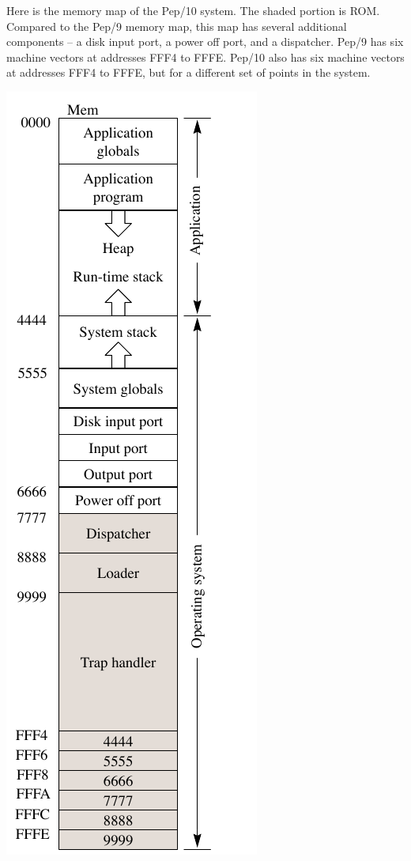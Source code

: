 \documentclass[10pt,fleqn]{book}
\begin{document}
\newpage

\noindent Here is the memory map of the Pep/10 system.
The shaded portion is ROM.
Compared to the Pep/9 memory map, this map has several additional components -- a disk input port, a power off port, and a dispatcher.
Pep/9 has six machine vectors at addresses FFF4 to FFFE.
Pep/10 also has six machine vectors at addresses FFF4 to FFFE, but for a different set of points in the system.
\\
\begin{center}
\includegraphics{pep10-memory-map}
\end{center}
\end{document}
